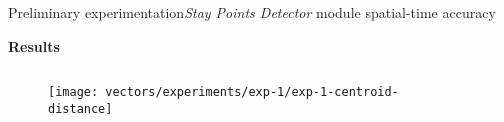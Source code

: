 \begin{frame}{Preliminary experimentation}{\emph{Stay Points Detector} module spatial-time accuracy}
\vspace{-0.5cm}
\begin{block}{\small \textbf{Results}}
\begin{columns}
\begin{column}{0.65\textwidth}
\begin{figure}
  \centering
  \texttt{[image: vectors/experiments/exp-1/exp-1-centroid-distance]}
\end{figure}
\end{column}
\begin{column}{0.3\textwidth}
\end{column}
\end{columns}

\end{block}
\end{frame}

